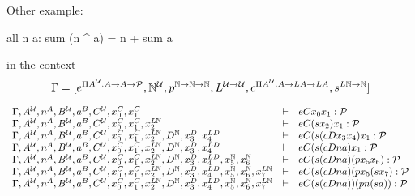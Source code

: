 Other example:

\begin{alba}
  all n a: sum (n ^ a) = n + sum a
\end{alba}
in the context
$$
\Gamma = [
e^{\Pi A^{\cal{U}}. A\to A\to{\cal{P}}},
{\mathbb{N}}^{\cal{U}},
p^{{\mathbb{N}}\to{\mathbb{N}}\to{\mathbb{N}}},
L^{{\cal{U}}\to{\cal{U}}},
c^{\Pi A^{\cal{U}}. A \to L A \to L A},
s^{L {\mathbb{N}} \to {\mathbb{N}}}
]
$$


$$
\begin{array}{lll}
  \Gamma, A^\Any, n^A, B^\Any, a^B, C^\Any, x_0^C, x_1^C
  & \vdash
  & e C x_0 x_1 : \Prop

  \\

  \Gamma, A^\Any, n^A, B^\Any, a^B, C^\Any, x_0^C, x_1^C, x_2^{L\Natural}
  & \vdash
  & e C (s x_2) x_1 : \Prop

  \\

  \Gamma, A^\Any, n^A, B^\Any, a^B, C^\Any, x_0^C, x_1^C, x_2^{L\Natural},
  D^\Natural, x_3^D, x_4^{L D}
  & \vdash
  & e C (s (c D x_3 x_4) x_1 : \Prop

  \\

  \Gamma, A^\Any, n^A, B^\Any, a^B, C^\Any, x_0^C, x_1^C, x_2^{L\Natural},
  D^\Natural, x_3^D, x_4^{L D}
  & \vdash
  & e C (s (c D n a) x_1 : \Prop

  \\

  \Gamma, A^\Any, n^A, B^\Any, a^B, C^\Any, x_0^C, x_1^C, x_2^{L\Natural},
  D^\Natural, x_3^D, x_4^{L D}, x_5^\Natural, x_6^\Natural
  & \vdash
  & e C (s (c D n a) (p x_5 x_6) : \Prop

  \\

  \Gamma, A^\Any, n^A, B^\Any, a^B, C^\Any, x_0^C, x_1^C, x_2^{L\Natural},
  D^\Natural, x_3^D, x_4^{L D}, x_5^\Natural, x_6^\Natural,
  x_7^{L\Natural}
  & \vdash
  & e C (s (c D n a) (p x_5 (s x_7) : \Prop

  \\

  \Gamma, A^\Any, n^A, B^\Any, a^B, C^\Any, x_0^C, x_1^C, x_2^{L\Natural},
  D^\Natural, x_3^D, x_4^{L D}, x_5^\Natural, x_6^\Natural,
  x_7^{L\Natural}
  & \vdash
  & e C (s (c D n a)) (p n (s a)) : \Prop

\end{array}
$$
%


